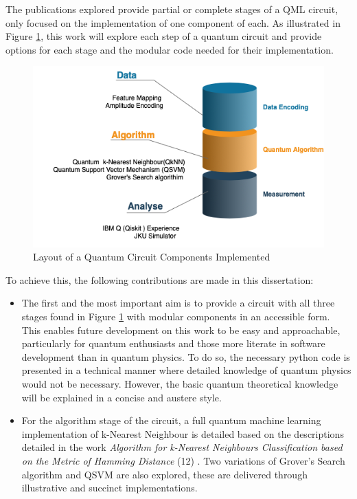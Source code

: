 The publications explored provide partial or complete stages of a QML circuit, only focused on the implementation of one component of each. As illustrated in Figure \ref{ImpleLayout}, this work will explore each step of a quantum circuit and provide options for each stage and the modular code needed for their implementation. 


\begin{figure}[h!]
      \centering
      \includegraphics[scale=0.6]{background/MyLayoutImple.png}
      \caption{Layout of a Quantum Circuit Components Implemented}
      \label{ImpleLayout}
\end{figure}


To achieve this, the following contributions are made in this dissertation:

\begin{itemize}
\item

The first and the most important aim is to provide a circuit with all three stages found in Figure \ref{ImpleLayout} with modular components in an accessible form. This enables future development on this work to be easy and approachable, particularly for quantum enthusiasts and those more literate in software development than in quantum physics. To do so, the necessary python code is presented in a technical manner where detailed knowledge of quantum physics would not be necessary. However, the basic quantum theoretical knowledge will be explained in a concise and austere style.

\end{itemize}

\begin{itemize}
\item
For the algorithm stage of the circuit, a full quantum machine learning  %
implementation of k-Nearest Neighbour is detailed based on the descriptions detailed in the work \emph{ Algorithm for k-Nearest Neighbours Classification based on the Metric of Hamming Distance} (12) \citep{sharmaQeml}. %
Two variations of Grover’s Search algorithm and QSVM are also explored, these are delivered through illustrative and succinct implementations.

\end{itemize}



